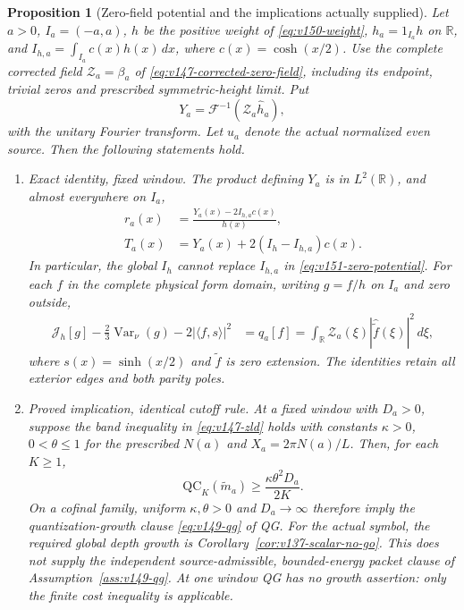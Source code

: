 \documentclass[11pt]{article}
\newtheorem{proposition}[theorem]{Proposition}
\theoremstyle{remark}
\begin{document}
\begin{proposition}[Zero-field potential and the implications actually supplied]
\label{prop:v151-input-comparison}
Let $a>0$, $I_a=(-a,a)$, $h$ be the positive weight of
\eqref{eq:v150-weight}, $h_a=1_{I_a}h$ on $\mathbb R$, and
$I_{h,a}=\int_{I_a}c(x)h(x)\,dx$, where $c(x)=\cosh(x/2)$.
Use the complete corrected field $\mathcal Z_a=\beta_a$ of
\eqref{eq:v147-corrected-zero-field}, including its endpoint, trivial
zeros and prescribed symmetric-height limit. Put
\[
 Y_a=\mathcal F^{-1}(\mathcal Z_a\widehat h_a),
\]
with the unitary Fourier transform. Let $u_a$ denote the actual normalized
even source. Then the following statements hold.
\begin{enumerate}[label=(\roman*)]
\item \emph{Exact identity, fixed window.} The product defining $Y_a$
is in $L^2(\mathbb R)$, and almost everywhere on $I_a$,
\begin{align}
 r_a(x)&=\frac{Y_a(x)-2I_{h,a}c(x)}{h(x)},
       \label{eq:v151-zero-potential}\\
 T_a(x)&=Y_a(x)+2(I_h-I_{h,a})c(x).
       \label{eq:v151-zero-exterior}
\end{align}
In particular, the global $I_h$ cannot replace $I_{h,a}$ in
\eqref{eq:v151-zero-potential}. For each $f$ in the complete physical
form domain, writing $g=f/h$ on $I_a$ and zero outside,
\begin{align}
 \mathcal J_h[g]-\tfrac23\operatorname{Var}_{\nu}(g)
              -2|\langle f,s\rangle|^2
 &=q_a[f]
 =\int_{\mathbb R}\mathcal Z_a(\xi)
                   |\widehat{\widetilde f}(\xi)|^2\,d\xi,
 \label{eq:v151-zero-energy}
\end{align}
where $s(x)=\sinh(x/2)$ and $\widetilde f$ is zero extension.
The identities retain all exterior edges and both parity poles.

\item \emph{Proved implication, identical cutoff rule.} At a fixed
window with $D_a>0$, suppose the band inequality in
\eqref{eq:v147-zld} holds with constants $\kappa>0$, $0<\theta\le1$ for the
prescribed $N(a)$ and $X_a=2\pi N(a)/L$. Then, for each $K\ge1$,
\begin{equation}\label{eq:v151-zld-qg}
 \mathrm{QC}_K(\widetilde m_a)
       \ge\frac{\kappa\theta^2D_a}{2K}.
\end{equation}
On a cofinal family, uniform $\kappa,\theta>0$ and $D_a\to\infty$
therefore imply the quantization-growth clause
\eqref{eq:v149-qg} of QG. For the actual symbol, the required global
depth growth is Corollary~\ref{cor:v137-scalar-no-go}. This does
\emph{not} supply the independent source-admissible, bounded-energy
packet clause of Assumption~\ref{ass:v149-qg}. At one window QG
has no growth assertion: only the finite cost inequality is applicable.


\end{enumerate}
\end{proposition}
\end{document}
